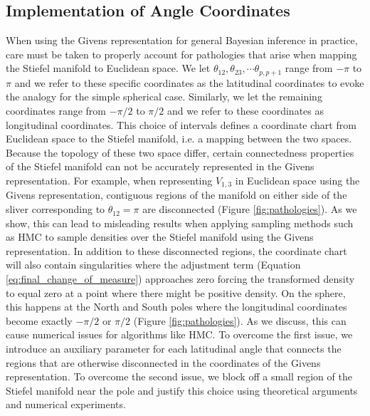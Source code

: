 \documentclass[ba]{imsart}
\numberwithin{equation}{section}
\theoremstyle{plain}
\begin{document}

\subsection{Implementation of Angle Coordinates}
When using the Givens representation for general Bayesian inference in practice, care must be taken to properly account for pathologies that arise when mapping the Stiefel manifold to Euclidean space. We let $\theta_{12}, \theta_{23}, \cdots \theta_{p,p+1}$ range from $-\pi$ to $\pi$ and we refer to these specific coordinates as the latitudinal coordinates to evoke the analogy for the simple spherical case. Similarly, we let the remaining coordinates range from $-\pi/2$ to $\pi/2$ and we refer to these coordinates as longitudinal coordinates. This choice of intervals defines a coordinate chart from Euclidean space to the Stiefel manifold, i.e. a mapping between the two spaces. Because the topology of these two space differ, certain connectedness properties of the Stiefel manifold can not be accurately represented in the Givens representation. For example, when representing $V_{1,3}$ in Euclidean space using the Givens representation, contiguous regions of the manifold on either side of the sliver corresponding to $\theta_{12} = \pi$ are disconnected (Figure \ref{fig:pathologies}). As we show, this can lead to misleading results when applying sampling methods such as HMC to sample densities over the Stiefel manifold using the Givens representation. In addition to these disconnected regions, the coordinate chart will also contain singularities where the adjustment term (Equation \ref{eq:final_change_of_measure}) approaches zero forcing the transformed density to equal zero at a point where there might be positive density. On the sphere, this happens at the North and South poles where the longitudinal coordinates become exactly $-\pi/2$ or $\pi/2$ (Figure \ref{fig:pathologies}). As we discuss, this can cause numerical issues for algorithms like HMC. To overcome the first issue, we introduce an auxiliary parameter for each latitudinal angle that connects the regions that are otherwise disconnected in the coordinates of the Givens representation. To overcome the second issue, we block off a small region of the Stiefel manifold near the pole and justify this choice using theoretical arguments and numerical experiments.
\end{document}
